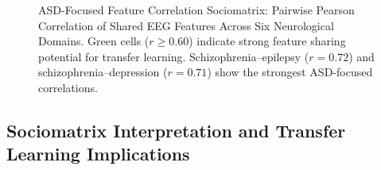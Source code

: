 \begin{figure}[!htbp]
{%
}%
\caption[ASD-focused sociomatrix]{ASD-Focused Feature Correlation Sociomatrix: Pairwise Pearson Correlation of Shared EEG Features Across Six Neurological Domains. Green cells ($r \geq 0.60$) indicate strong feature sharing potential for transfer learning. Schizophrenia--epilepsy ($r = 0.72$) and schizophrenia--depression ($r = 0.71$) show the strongest ASD-focused correlations.}
\label{fig:sociomatrix}
\end{figure}

\subsection{Sociomatrix Interpretation and Transfer Learning Implications}

